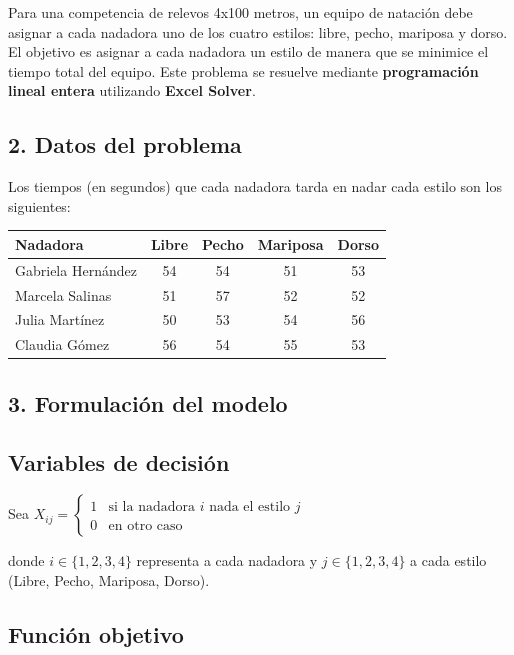 \documentclass[12pt, a4paper, oneside]{book}
\theoremstyle{definition}
\begin{document}
    Para una competencia de relevos 4x100 metros, un equipo de natación debe asignar a cada nadadora uno de los cuatro estilos: libre, pecho, mariposa y dorso. El objetivo es asignar a cada nadadora un estilo de manera que se minimice el tiempo total del equipo. Este problema se resuelve mediante \textbf{programación lineal entera} utilizando \textbf{Excel Solver}.

    \subsection{2. Datos del problema}

    Los tiempos (en segundos) que cada nadadora tarda en nadar cada estilo son los siguientes:

    \begin{center}
    \begin{tabular}{lcccc}
    \toprule
    \textbf{Nadadora} & \textbf{Libre} & \textbf{Pecho} & \textbf{Mariposa} & \textbf{Dorso} \\
    \midrule
    Gabriela Hernández & 54 & 54 & 51 & 53 \\
    Marcela Salinas     & 51 & 57 & 52 & 52 \\
    Julia Martínez      & 50 & 53 & 54 & 56 \\
    Claudia Gómez       & 56 & 54 & 55 & 53 \\
    \bottomrule
    \end{tabular}
    \end{center}

    \subsection{3. Formulación del modelo}

    \subsection{Variables de decisión}

    Sea $X_{ij} = 
    \begin{cases}
    1 & \text{si la nadadora } i \text{ nada el estilo } j \\
    0 & \text{en otro caso}
    \end{cases}$

    donde \( i \in \{1,2,3,4\} \) representa a cada nadadora y \( j \in \{1,2,3,4\} \) a cada estilo (Libre, Pecho, Mariposa, Dorso).

    \subsection{Función objetivo}
\end{document}
